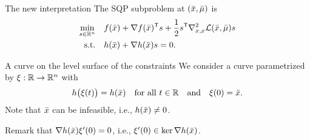 \documentclass[
]{talk}
\newcommand*{\ceq}{h}
\newcommand*{\iter}[1][]{x\ifblank{#1}{}{_{#1}}}
\newcommand*{\lag}{\mathcal{L}}
\newcommand*{\lmeq}[1][]{\mu\ifblank{#1}{}{_{#1}}}
\newcommand*{\obj}{f}
\newcommand*{\step}[1][]{s\ifblank{#1}{}{_{#1}}}
\begin{document}
\begin{frame}{The new interpretation}
    The SQP subproblem at $(\bar{\iter}, \bar{\lmeq})$ is
    \begin{equation*}
        \begin{aligned}
            \min_{\step \in \R^n}   & \quad \obj(\bar{\iter}) + \nabla \obj(\bar{\iter})^{\T} \step + \frac{1}{2} \step^{\T} \nabla_{\iter, \iter}^2 \lag(\bar{\iter}, \bar{\lmeq}) \step\\
            \textrm{s.t.}           & \quad \ceq(\bar{\iter}) + \nabla \ceq(\bar{\iter}) \step = 0\text{.}
        \end{aligned}
    \end{equation*}

    \begin{block}{A curve on the level surface of the constraints}
        We consider a \alert{curve} parametrized by $\xi : \mathbb{R} \to \mathbb{R}^n$ with
        \begin{equation*}
            \ceq\big(\xi(t)\big) = \ceq(\bar{\iter}) \quad \text{for all $t \in \R$} \quad \text{and} \quad \xi(0) = \bar{\iter}\text{.}
        \end{equation*}
        Note that $\bar{\iter}$ can be \alert{infeasible}, i.e., $\ceq(\bar{\iter}) \neq 0$.
    \end{block}

    \medskip

    Remark that $\nabla \ceq(\bar{\iter}) \xi'(0) = 0$, i.e., $\xi'(0) \in \ker \nabla \ceq(\bar{\iter})$.
\end{frame}
\end{document}
